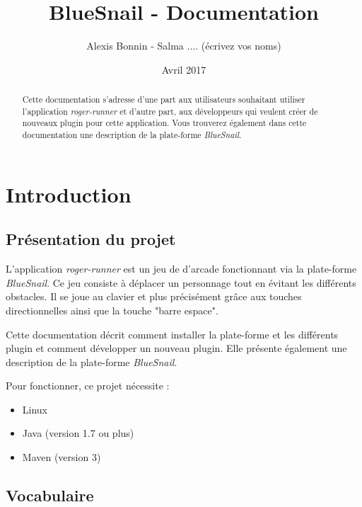 \documentclass[11pt]{article}
\title{BlueSnail - Documentation}
\author{Alexis Bonnin - Salma .... (écrivez vos noms)}
\date{Avril 2017}
\begin{document}
\maketitle

\begin{abstract}
    Cette documentation s'adresse d'une part aux utilisateurs souhaitant utiliser l'application \textit{roger-runner} et d'autre part, aux développeurs qui veulent créer de nouveaux plugin pour cette application. Vous trouverez également dans cette documentation une description de la plate-forme \textit{BlueSnail}.
\end{abstract}

\tableofcontents

\newpage

\section{Introduction}

\subsection{Présentation du projet}
    L'application \textit{roger-runner} est un jeu de d'arcade fonctionnant via la plate-forme \textit{BlueSnail}. Ce jeu consiste à déplacer un personnage tout en évitant les différents obstacles. Il se joue au clavier et plus précisément grâce aux touches directionnelles ainsi que la touche "barre espace".
    
    Cette documentation décrit comment installer la plate-forme et les différents plugin et comment développer un nouveau plugin. Elle présente également une description de la plate-forme \textit{BlueSnail}.
    
    Pour fonctionner, ce projet nécessite :
    \begin{itemize}
        \item Linux
        \item Java (version 1.7 ou plus)
        \item Maven (version 3)
    \end{itemize}
    
\subsection{Vocabulaire}
\label{subsec:vocabulaire}
\end{document}
